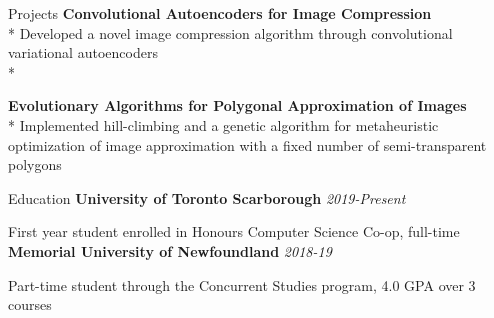 \documentclass[11pt, letterpaper]{article}
\begin{document}
\begin{section}{Projects}
\textbf{Convolutional Autoencoders for Image Compression}\\*
Developed a novel image compression algorithm through convolutional variational autoencoders\\*

\textbf{Evolutionary Algorithms for Polygonal Approximation of Images}\\*
Implemented hill-climbing and a genetic algorithm for metaheuristic optimization of image approximation with a fixed number of semi-transparent polygons\\

\end{section}

\begin{section}{Education}
\textbf{University of Toronto Scarborough}
\hfill
\textit{2019-Present}

First year student enrolled in Honours Computer Science Co-op, full-time\\

\textbf{Memorial University of Newfoundland}
\hfill
\textit{2018-19}

Part-time student through the Concurrent Studies program, 4.0 GPA over 3 courses\\
\end{section}
\end{document}
